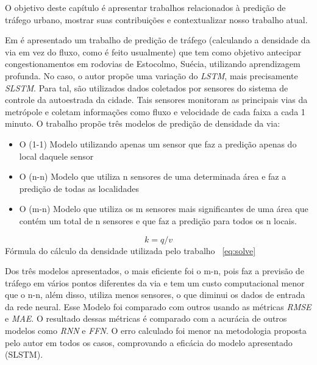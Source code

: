 
\label{chapter:trabalhos_relacionados}

O objetivo deste capítulo é apresentar trabalhos relacionados à predição de tráfego urbano, mostrar suas contribuições e contextualizar nosso trabalho atual.

Em  \cite{Zainab_2018} é apresentado um trabalho de predição de tráfego (calculando a densidade da via em vez do fluxo, como é feito usualmente) que tem como objetivo antecipar congestionamentos em rodovias de Estocolmo, Suécia, utilizando aprendizagem profunda. No caso, o autor propõe uma variação do \textit{\acrshort{LSTM}}, mais precisamente \textit{\acrfull{SLSTM}}. Para tal, são utilizados dados coletados por sensores do sistema de controle da autoestrada da cidade. Tais sensores monitoram as principais vias da metrópole e coletam informações como fluxo e velocidade de cada faixa a cada 1 minuto. O trabalho propõe três modelos de predição de densidade da via:
 
\begin{itemize}
    \item O (1-1) Modelo utilizando apenas um sensor que faz a predição apenas do local daquele sensor
    \item O (n-n) Modelo que utiliza n sensores de uma determinada área e faz a predição de todas as localidades
    \item O (m-n) Modelo que utiliza os m sensores mais significantes de uma área que contém um total de n sensores e que faz a predição para todos os n locais.
\end{itemize}

\begin{equation}\label{eq:solve}
k = q / v
\end{equation}
Fórmula do cálculo da densidade utilizada pelo trabalho ~\ref{eq:solve}


Dos três modelos apresentados, o mais eficiente foi o m-n, pois faz a previsão de tráfego em vários pontos diferentes da via e tem um custo computacional menor que o n-n, além disso, utiliza menos sensores, o que diminui os dados de entrada da rede neural. Esse Modelo foi comparado com outros usando as métricas \textit{\acrshort{RMSE}} e \textit{\acrshort{MAE}}. O resultado dessas métricas é comparado com a acurácia de outros modelos como \textit{\acrfull{RNN}} e \textit{\acrfull{FFN}}. O erro calculado foi menor na metodologia proposta pelo autor em todos os casos, comprovando a eficácia do modelo apresentado (SLSTM).

